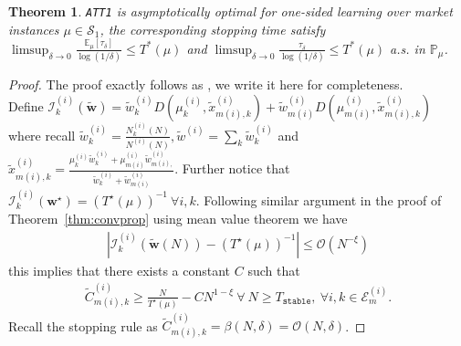 \documentclass{article}
\newcommand{\E}{\mathbb{E}}
\newtheorem{theorem}{Theorem}
\begin{document}
\begin{theorem}
 \texttt{ATT1} is asymptotically optimal for one-sided learning over market instances $\mu\in \mathcal{S}_{1}$, the corresponding stopping time satisfy $\limsup_{\delta\to 0}\frac{\E_{\mu}[\tau_{\delta}]}{\log(1/\delta)}\leq T^*(\mu)$ and $\limsup_{\delta\to 0}\frac{\tau_{\delta}}{\log(1/\delta)}\leq T^*(\mu)$ a.s. in $\mathbb{P}_\mu$. 
\end{theorem}
\begin{proof}
The proof exactly follows as 
\cite[Appendix H]{bandyopadhyay2024optimal}, we write it here for completeness.\\
Define $\mathcal{I}^{(i)}_k(\tilde{\bm{w}})=\tilde{w}^{(i)}_{k}D(\mu^{(i)}_k,\tilde{x}^{(i)}_{m(i),k})+\tilde{w}^{(i)}_{m(i)}D(\mu^{(i)}_{m(i)},\tilde{x}^{(i)}_{m(i),k})$ where recall $\tilde{w}^{(i)}_k=\frac{N^{(i)}_k(N)}{N^{(i)}(N)},\tilde{w}^{(i)}=\sum_k\tilde{w}^{(i)}_k$ and $\tilde{x}^{(i)}_{m(i),k} = \frac{\mu^{(i)}_k\tilde{w}^{(i)}_{k}+\mu^{(i)}_{m(i)}\tilde{w}^{(i)}_{m(i),}}{\tilde{w}^{(i)}_{k}+\tilde{w}^{(i)}_{m(i)}}$. Further notice that $\mathcal{I}^{(i)}_k({\bm{w}^{\star}})=(T^{\star}(\mu))^{-1}\ \forall i,k$. Following similar argument in the proof of Theorem~\ref{thm:convprop} using mean value theorem we have
\begin{align*}
    |\mathcal{I}^{(i)}_k(\tilde{\bm{w}}(N))-(T^{\star}(\mu))^{-1}|\leq \mathcal{O}(N^{-\xi})
\end{align*}
this implies that there exists a constant $C$ such that
\begin{align}
    \tilde{C}^{(i)}_{m(i),k}\geq \frac{N}{T^{\star}(\mu)}-CN^{1-\xi}\ \forall\ N\geq T_{\texttt{stable}},\ \forall i,k\in\mathcal{E}^{(i)}_m.\label{eq:stopplB}
\end{align}
Recall the stopping rule as $ \tilde{C}^{(i)}_{m(i),k}=\beta(N,\delta)=\mathcal{O}(N,\delta)$.


\end{proof}
\end{document}
